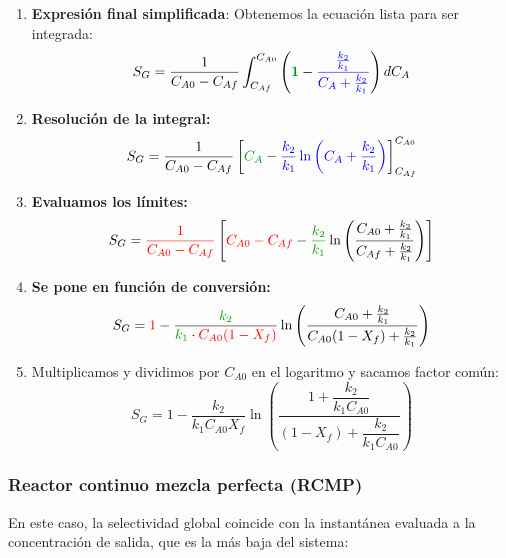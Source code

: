 \begin{enumerate}
  \item \textbf{Expresión final simplificada}: Obtenemos la ecuación lista para ser integrada:
        \begin{equation}
          S_G = \frac{1}{C_{A0}-C_{Af}} \int_{C_{Af}}^{C_{A0}} \left( \textcolor{darkgreen}{\mathbf{1}} - \textcolor{blue}{\frac{\frac{k_2}{k_1}}{C_A + \frac{k_2}{k_1}}} \right) dC_A
        \end{equation}
  \item \textbf{Resolución de la integral:}
        \begin{equation}
          S_G = \frac{1}{C_{A0}-C_{Af}} \left[ \textcolor{darkgreen}{C_A} - \textcolor{blue}{\frac{k_2}{k_1} \ln\left(C_A + \frac{k_2}{k_1}\right)} \right]_{C_{Af}}^{C_{A0}}
        \end{equation}
  \item \textbf{Evaluamos los límites:}
        \begin{equation}
          S_G = \textcolor{red}{\frac{1}{C_{A0}-C_{Af}}} \left[ \textcolor{red}{C_{A0}-C_{Af}} - \textcolor{darkgreen}{\frac{k_2}{k_1}} \ln\left(\frac{C_{A0} + \frac{k_2}{k_1}}{C_{Af} + \frac{k_2}{k_1}}\right) \right]
        \end{equation}
  \item \textbf{Se pone en función de conversión:}
        \begin{equation}
          S_G = \textcolor{red}{1} - \frac{\textcolor{darkgreen}{k_2}}{\textcolor{darkgreen}{k_1} \cdot \textcolor{red}{C_{A0} (1-X_f)}} \ln \left( \frac{C_{A0} + \frac{k_2}{k_1}}{C_{A0}(1-X_f) + \frac{k_2}{k_1}} \right)
        \end{equation}
  \item Multiplicamos y dividimos por $C_{A0}$ en el logaritmo y sacamos factor común:
        \begin{equation}
          S_G = 1 - \frac{k_2}{k_1 C_{A0} X_f} \ln \left( \frac{1 + \dfrac{k_2}{k_1 C_{A0}}}{(1-X_f) + \dfrac{k_2}{k_1 C_{A0}}} \right)
        \end{equation}
\end{enumerate}


\subsubsection{Reactor continuo mezcla perfecta (RCMP)}
\noindent En este caso, la selectividad global coincide con la instantánea evaluada a la concentración de salida, que es la más baja del sistema:

